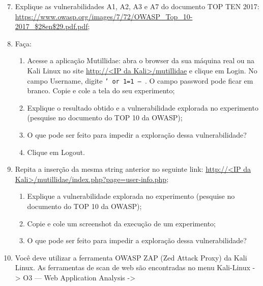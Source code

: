 \documentclass{article}
\begin{document}
    \begin{superframe}
        \begin{enumerate}
            \setcounter{enumi}{6}
            \item Explique as vulnerabilidades A1, A2, A3 e A7 do documento TOP
                TEN 2017:
                \url{https://www.owasp.org/images/7/72/OWASP_Top_10-2017_$28en$29.pdf.pdf};
            \item Faça:
                \begin{enumerate}
                    \item Acesse a aplicação Mutillidae: abra o browser da sua
                        máquina real ou na Kali Linux no site \url{http://<IP
                        da Kali>/mutillidae} e clique em Login. No campo
                        Username, digite \texttt{' or 1=1 -- }. O campo
                        password pode ficar em branco. Copie e cole a tela do
                        seu experimento;
                    \item Explique o resultado obtido e a vulnerabilidade
                        explorada no experimento (pesquise no documento do TOP
                        10 da OWASP);
                    \item O que pode ser feito para impedir a exploração dessa
                        vulnerabilidade?
                    \item Clique em Logout.
                \end{enumerate}
            \item Repita a inserção da mesma string anterior no seguinte link:
                \url{http://<IP da Kali>/mutillidae/index.php?page=user-info.php};
                \begin{enumerate}
                    \item Explique a vulnerabilidade explorada no experimento
                        (pesquise no documento do TOP 10 da OWASP);
                    \item Copie e cole um screenshot da execução de um
                        experimento;
                    \item O que pode ser feito para impedir a exploração dessa
                        vulnerabilidade?
                \end{enumerate}
            \item Você deve utilizar a ferramenta OWASP ZAP (Zed Attack Proxy)
                da Kali Linux. As ferramentas de scan de web são encontradas no
                menu Kali-Linux -> O3 --- Web Application Analysis ->

\end{enumerate}
\end{superframe}
\end{document}
